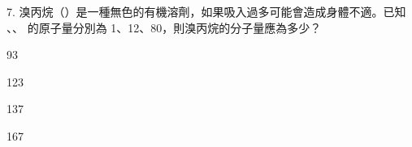 \documentclass[12pt]{article}
\begin{document}
\begin{problem}
  \item[7.] 溴丙烷（）是一種無色的有機溶劑，如果吸入過多可能會造成身體不適。已知 、、 的原子量分別為 1、12、80，則溴丙烷的分子量應為多少？
  \begin{choices}
    \item 93
    \item 123
    \item 137
    \item 167
  \end{choices}
\end{problem}
\end{document}

